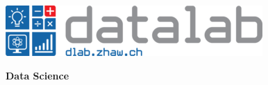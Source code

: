 \noindent
\begin{minipage}[t]{0.4\textwidth} 
\includegraphics[width=\linewidth]{logo_cas.png}
\end{minipage}%
\hfill%
\begin{minipage}[t]{0.6\textwidth}\raggedleft
\textbf{\large Data Science}
\end{minipage}


